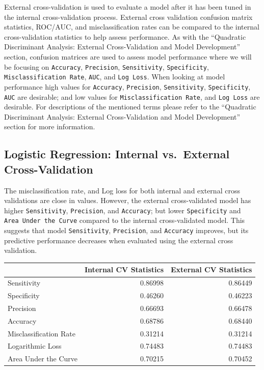 \documentclass[american,]{article}
\begin{document}
External cross-validation is used to evaluate a model after it has been tuned in the internal cross-validation process. External cross validation confusion matrix statistics, ROC/AUC, and misclassification rates can be compared to the internal cross-validation statistics to help assess performance. As with the ``Quadratic Discriminant Analysis: External Cross-Validation and Model Development'' section, confusion matrices are used to assess model performance where we will be focusing on \texttt{Accuracy}, \texttt{Precision}, \texttt{Sensitivity}, \texttt{Specificity}, \texttt{Misclassification\ Rate}, \texttt{AUC}, and \texttt{Log\ Loss}. When looking at model performance high values for \texttt{Accuracy}, \texttt{Precision}, \texttt{Sensitivity}, \texttt{Specificity}, \texttt{AUC} are desirable; and low values for \texttt{Misclassification\ Rate}, and \texttt{Log\ Loss} are desirable. For descriptions of the mentioned terms please refer to the ``Quadratic Discriminant Analysis: External Cross-Validation and Model Development'' section for more information.

\hypertarget{logistic-regression-internal-vs.-external-cross-validation}{%
\subsection{\texorpdfstring{\textbf{Logistic Regression: Internal vs.~External Cross-Validation}}{Logistic Regression: Internal vs.~External Cross-Validation}}\label{logistic-regression-internal-vs.-external-cross-validation}}

The misclassification rate, and Log loss for both internal and external cross validations are close in values. However, the external cross-validated model has higher \texttt{Sensitivity}, \texttt{Precision}, and \texttt{Accuracy}; but lower \texttt{Specificity} and \texttt{Area\ Under\ the\ Curve} compared to the internal cross-validated model. This suggests that model \texttt{Sensitivity}, \texttt{Precision}, and \texttt{Accuracy} improves, but its predictive performance decreases when evaluated using the external cross validation.

\begin{table}[H]
\centering
\begin{tabular}{lrr}
\toprule
  & Internal CV Statistics & External CV Statistics\\
\midrule
\rowcolor{gray!6}  Sensitivity & 0.86998 & 0.86449\\
Specificity & 0.46260 & 0.46223\\
\rowcolor{gray!6}  Precision & 0.66693 & 0.66478\\
Accuracy & 0.68786 & 0.68440\\
\rowcolor{gray!6}  Misclassification Rate & 0.31214 & 0.31214\\
\addlinespace
Logarithmic Loss & 0.74483 & 0.74483\\
\rowcolor{gray!6}  Area Under the Curve & 0.70215 & 0.70452\\
\bottomrule
\end{tabular}
\end{table}
\end{document}

